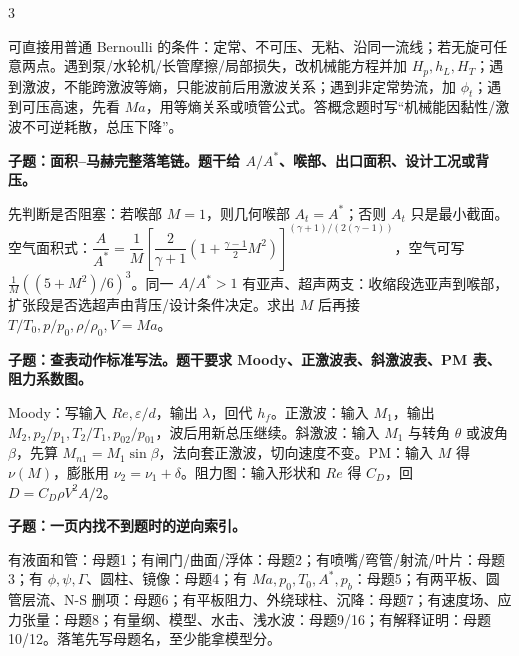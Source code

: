 \documentclass[a4paper]{article}
\newcommand{\qt}[1]{\vspace{0.10pt}\colorbox{Q}{\parbox{\dimexpr\linewidth-2\fboxsep}{\color{white}\bfseries #1}}\par}
\newcommand{\ans}[1]{\colorbox{G}{\parbox{\dimexpr\linewidth-2\fboxsep}{#1}}\par}
\begin{document}
\begin{multicols}{3}
\ans{可直接用普通 Bernoulli 的条件：定常、不可压、无粘、沿同一流线；若无旋可任意两点。遇到泵/水轮机/长管摩擦/局部损失，改机械能方程并加 $H_p,h_L,H_T$；遇到激波，不能跨激波等熵，只能波前后用激波关系；遇到非定常势流，加 $\phi_t$；遇到可压高速，先看 $Ma$，用等熵关系或喷管公式。答概念题时写“机械能因黏性/激波不可逆耗散，总压下降”。}
\qt{子题：面积--马赫完整落笔链。题干给 $A/A^*$、喉部、出口面积、设计工况或背压。}
\ans{先判断是否阻塞：若喉部 $M=1$，则几何喉部 $A_t=A^*$；否则 $A_t$ 只是最小截面。空气面积式：$\dfrac{A}{A^*}=\dfrac1M\left[\dfrac{2}{\gamma+1}(1+\frac{\gamma-1}{2}M^2)\right]^{(\gamma+1)/(2(\gamma-1))}$，空气可写 $\frac1M((5+M^2)/6)^3$。同一 $A/A^*>1$ 有亚声、超声两支：收缩段选亚声到喉部，扩张段是否选超声由背压/设计条件决定。求出 $M$ 后再接 $T/T_0,p/p_0,\rho/\rho_0,V=Ma$。}
\qt{子题：查表动作标准写法。题干要求 Moody、正激波表、斜激波表、PM 表、阻力系数图。}
\ans{Moody：写输入 $Re,\varepsilon/d$，输出 $\lambda$，回代 $h_f$。正激波：输入 $M_1$，输出 $M_2,p_2/p_1,T_2/T_1,p_{02}/p_{01}$，波后用新总压继续。斜激波：输入 $M_1$ 与转角 $\theta$ 或波角 $\beta$，先算 $M_{n1}=M_1\sin\beta$，法向套正激波，切向速度不变。PM：输入 $M$ 得 $\nu(M)$，膨胀用 $\nu_2=\nu_1+\delta$。阻力图：输入形状和 $Re$ 得 $C_D$，回 $D=C_D\rho V^2A/2$。}
\qt{子题：一页内找不到题时的逆向索引。}
\ans{有液面和管：母题1；有闸门/曲面/浮体：母题2；有喷嘴/弯管/射流/叶片：母题3；有 $\phi,\psi,\Gamma$、圆柱、镜像：母题4；有 $Ma,p_0,T_0,A^*,p_b$：母题5；有两平板、圆管层流、N-S 删项：母题6；有平板阻力、外绕球柱、沉降：母题7；有速度场、应力张量：母题8；有量纲、模型、水击、浅水波：母题9/16；有解释证明：母题10/12。落笔先写母题名，至少能拿模型分。}


\end{multicols}
\end{document}
